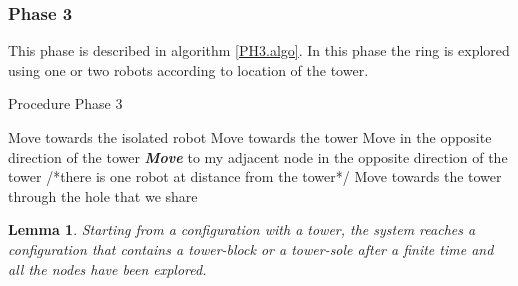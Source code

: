 \documentclass[12pt]{llncs}
\newtheorem{lem}{Lemma}
\begin{document}
\subsubsection{\textbf{Phase 3}}

This phase is described in algorithm \ref{PH3.algo}. In this phase the ring is explored using one or two robots according to location of the tower.

\begin{algorithm}[H]
\caption{Procedure Phase 3}
\label{PH3.algo}
\begin{algorithmic}[1]
                 \State Move towards the isolated robot 
             \EndIf
        \EndIf
                   \State Move towards the tower
               \Else
                    \State Move in the opposite direction of the tower
               \EndIf
    \Else
                    \State \textbf{\textit{Move}} to my adjacent node in the opposite direction of the tower
                \EndIf
           \EndIf
    \EndIf
\Else /*there is one robot at distance  from the tower*/
         \State Move towards the tower through the hole that we share
     \EndIf
\EndIf


\end{algorithmic}
\end{algorithm}   

\begin{lem}
\label{lem:PH3}
Starting from a configuration with a tower, the system reaches a configuration that contains a tower-block or a tower-sole after a finite time and all the nodes have been explored. 
\end{lem}  
\end{document}
